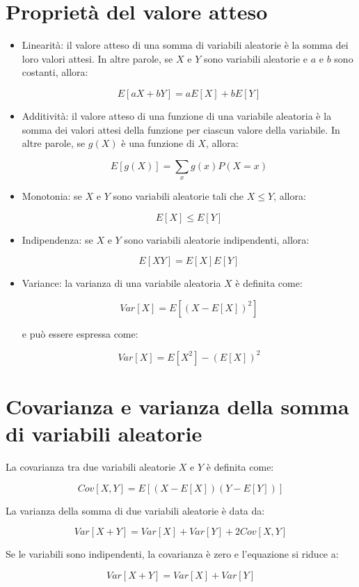 \section{Proprietà del valore atteso}

\begin{itemize}
\item Linearità: il valore atteso di una somma di variabili aleatorie è la somma dei loro valori attesi. In altre parole, se $X$ e $Y$ sono variabili aleatorie e $a$ e $b$ sono costanti, allora:

$$E[aX + bY] = aE[X] + bE[Y]$$

\item Additività: il valore atteso di una funzione di una variabile aleatoria è la somma dei valori attesi della funzione per ciascun valore della variabile. In altre parole, se $g(X)$ è una funzione di $X$, allora:

$$E[g(X)] = \sum_{x} g(x) P(X=x)$$

\item Monotonia: se $X$ e $Y$ sono variabili aleatorie tali che $X \leq Y$, allora:

$$E[X] \leq E[Y]$$

\item Indipendenza: se $X$ e $Y$ sono variabili aleatorie indipendenti, allora:

$$E[XY] = E[X]E[Y]$$

\item Variance: la varianza di una variabile aleatoria $X$ è definita come:

$$Var[X] = E[(X - E[X])^2]$$

e può essere espressa come:

$$Var[X] = E[X^2] - (E[X])^2$$
\end{itemize}

\section{Covarianza e varianza della somma di variabili aleatorie}
La covarianza tra due variabili aleatorie $X$ e $Y$ è definita come:

$$Cov[X,Y] = E[(X - E[X])(Y - E[Y])]$$

La varianza della somma di due variabili aleatorie è data da:

$$Var[X + Y] = Var[X] + Var[Y] + 2Cov[X,Y]$$

Se le variabili sono indipendenti, la covarianza è zero e l'equazione si riduce a:

$$Var[X + Y] = Var[X] + Var[Y]$$

